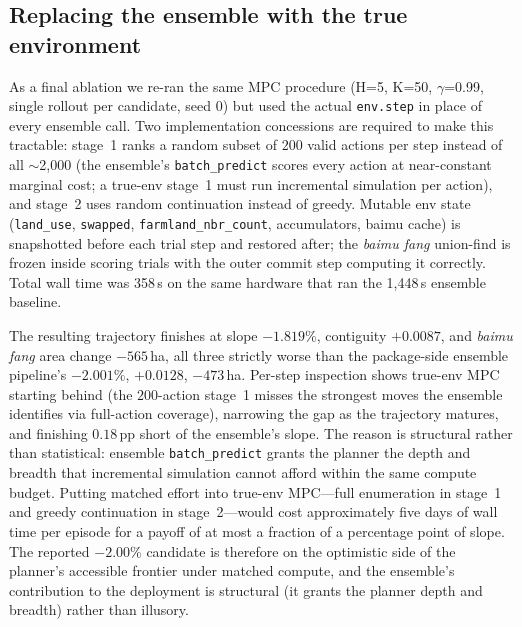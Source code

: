 \documentclass[11pt]{article}
\begin{document}
\subsection{Replacing the ensemble with the true environment}\label{sec:methods-trueenv}

As a final ablation we re-ran the same MPC procedure (H=5, K=50, $\gamma$=0.99, single rollout per candidate, seed 0) but used the actual \texttt{env.step} in place of every ensemble call. Two implementation concessions are required to make this tractable: stage~1 ranks a random subset of $200$ valid actions per step instead of all $\sim$2{,}000 (the ensemble's \texttt{batch\_predict} scores every action at near-constant marginal cost; a true-env stage~1 must run incremental simulation per action), and stage~2 uses random continuation instead of greedy. Mutable env state (\texttt{land\_use}, \texttt{swapped}, \texttt{farmland\_nbr\_count}, accumulators, baimu cache) is snapshotted before each trial step and restored after; the \textit{baimu fang} union-find is frozen inside scoring trials with the outer commit step computing it correctly. Total wall time was 358\,s on the same hardware that ran the 1{,}448\,s ensemble baseline.

The resulting trajectory finishes at slope $-1.819\%$, contiguity $+0.0087$, and \textit{baimu fang} area change $-565$\,ha, all three strictly worse than the package-side ensemble pipeline's $-2.001\%$, $+0.0128$, $-473$\,ha. Per-step inspection shows true-env MPC starting behind (the $200$-action stage~1 misses the strongest moves the ensemble identifies via full-action coverage), narrowing the gap as the trajectory matures, and finishing $0.18$\,pp short of the ensemble's slope. The reason is structural rather than statistical: ensemble \texttt{batch\_predict} grants the planner the depth and breadth that incremental simulation cannot afford within the same compute budget. Putting matched effort into true-env MPC---full enumeration in stage~1 and greedy continuation in stage~2---would cost approximately five days of wall time per episode for a payoff of at most a fraction of a percentage point of slope. The reported $-2.00\%$ candidate is therefore on the optimistic side of the planner's accessible frontier under matched compute, and the ensemble's contribution to the deployment is structural (it grants the planner depth and breadth) rather than illusory.
\end{document}
